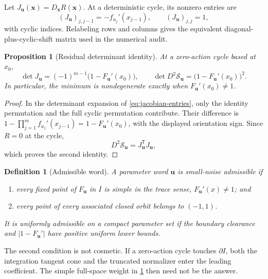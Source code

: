 \documentclass[11pt]{article}
\newtheorem{proposition}[theorem]{Proposition}
\newtheorem{definition}[theorem]{Definition}
\theoremstyle{remark}
\newcommand{\cS}{\mathcal S}
\newcommand{\bu}{\boldsymbol u}
\newcommand{\bx}{\boldsymbol x}
\begin{document}
Let $J_{\bu}(\bx)=D_{\bx}R(\bx)$.  At a deterministic cycle, its nonzero
entries are
\begin{equation}
 (J_{\bu})_{j,j-1}=-f_{u_j}'(x_{j-1}),
 \qquad (J_{\bu})_{j,j}=1,
 \label{eq:jacobian-entries}
\end{equation}
with cyclic indices.  Relabeling rows and columns gives the equivalent
diagonal-plus-cyclic-shift matrix used in the numerical audit.

\begin{proposition}[Residual determinant identity]
\label{prop:determinant}
At a zero-action cycle based at $x_0$,
\begin{equation}
 \det J_{\bu}=(-1)^{m-1}\bigl(1-F_{\bu}'(x_0)\bigr),
 \qquad
 \det D^2\cS_{\bu}=\bigl(1-F_{\bu}'(x_0)\bigr)^2.
 \label{eq:determinant-identity}
\end{equation}
In particular, the minimum is nondegenerate exactly when
$F_{\bu}'(x_0)\ne1$.
\end{proposition}

\begin{proof}
In the determinant expansion of \eqref{eq:jacobian-entries}, only the identity
permutation and the full cyclic permutation contribute.  Their difference is
$1-\prod_{j=1}^m f_{u_j}'(x_{j-1})=1-F_{\bu}'(x_0)$, with the displayed
orientation sign.  Since $R=0$ at the cycle,
\begin{equation*}
 D^2\cS_{\bu}=J_{\bu}^{\mathsf T}J_{\bu},
\end{equation*}
which proves the second identity.
\end{proof}

\begin{definition}[Admissible word]
\label{def:admissible}
A parameter word $\bu$ is \emph{small-noise admissible} if
\begin{enumerate}[label=(\roman*),leftmargin=2.2em]
 \item every fixed point of $F_{\bu}$ in $I$ is simple in the trace sense,
 $F_{\bu}'(x)\ne1$; and
 \item every point of every associated closed orbit belongs to $(-1,1)$.
\end{enumerate}
It is \emph{uniformly admissible} on a compact parameter set if the boundary
clearance and $|1-F_{\bu}'|$ have positive uniform lower bounds.
\end{definition}

The second condition is not cosmetic.  If a zero-action cycle touches
$\partial I$, both the integration tangent cone and the truncated normalizer
enter the leading coefficient.  The simple full-space weight in
\cref{prop:determinant} then need not be the answer.
\end{document}
